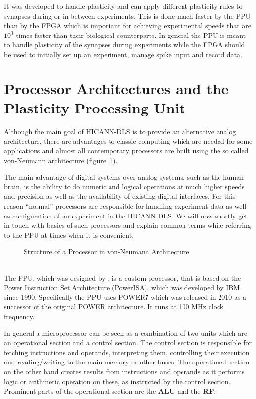 It was developed to handle plasticity and can apply different plasticity rules to synapses during or in between experiments.
This is done much faster by the \ac{PPU} than by the \ac{FPGA} which is important for achieving experimental speeds that are $10^{3}$ times faster than their biological counterparts.
In general the \ac{PPU} is meant to handle plasticity of the synapses during experiments while the \ac{FPGA} should be used to initially set up an experiment, manage spike input and record data.


\section{Processor Architectures and the Plasticity Processing Unit}
Although the main goal of \ac{HICANN-DLS} is to provide an alternative analog architecture, there are advantages to classic computing which are needed for some applications and almost all contemporary processors are built using the so called von-Neumann architecture (figure~\ref{fig:processor}). 

The main advantage of digital systems over analog systems, such as the human brain, is the ability to do numeric and logical operations at much higher speeds and precision as well as the availability of existing digital interfaces.
For this reason ``normal'' processors are responsible for handling experiment data as well as configuration of an experiment in the \ac{HICANN-DLS}.
We will now shortly get in touch with basics of such processors and explain common terms while referring to the \ac{PPU} at times when it is convenient.
\begin{figure}
    \centering
        \vspace*{17mm}
        
        \vspace*{-10mm}
        \caption{\label{fig:processor} Structure of a Processor in von-Neumann Architecture}
\end{figure}
\\
The \ac{PPU}, which was designed by \citeauthor{PPU}, is a custom processor, that is based on the Power Instruction Set Architecture (PowerISA), which was developed by IBM since 1990. 
Specifically the \ac{PPU} uses POWER7 which was released in 2010 as a successor of the original POWER architecture.
It runs at 100 MHz clock frequency.

In general a microprocessor can be seen as a combination of two units which are an operational section and a control section.
The control section is responsible for fetching instructions and operands, interpreting them, controlling their execution and reading/writing to the main memory or other buses.
The operational section on the other hand creates results from instructions and operands as it performs logic or arithmetic operation on these, as instructed by the control section.
Prominent parts of the operational section are the \textbf{\ac{ALU}} and the \textbf{\ac{RF}}.

